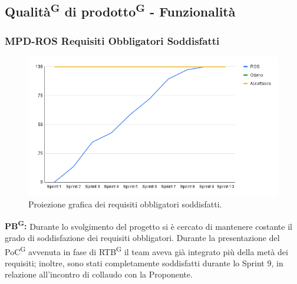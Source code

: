 \documentclass[8pt]{article}
\newcommand{\glossterm}[1]{#1\textsuperscript{G}} %
\begin{document}
\subsection{\glossterm{Qualità} di \glossterm{prodotto} - Funzionalità}
\subsubsection{MPD-ROS Requisiti Obbligatori Soddisfatti}
\begin{figure}[h!]
    \centering
    \includegraphics[width=1\textwidth]{images_pdq/ROS.png}
    \caption{Proiezione grafica dei requisiti obbligatori soddisfatti.}
    \label{fig:Proiezione grafica dei requisiti obbligatori soddisfatti}
\end{figure}
\textbf{\glossterm{PB}:} Durante lo svolgimento del progetto si è cercato di mantenere costante il grado di soddisfazione dei requisiti obbligatori. Durante la presentazione del \glossterm{PoC} avvenuta in fase di \glossterm{RTB} il team aveva già integrato più della metà dei requisiti; inoltre, sono stati completamente soddisfatti durante lo Sprint 9, in relazione all'incontro di collaudo con la Proponente.
\clearpage
\end{document}
